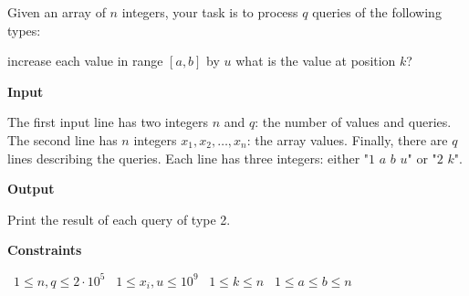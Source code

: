 Given an array of $n$ integers, your task is to process $q$ queries of the following types:

increase each value in range $[a,b]$ by $u$
what is the value at position $k$?

\vspace{0.3cm}\noindent\textbf{Input}

The first input line has two integers $n$ and $q$: the number of values and queries.
The second line has $n$ integers $x_1,x_2,\dots,x_n$: the array values.
Finally, there are $q$ lines describing the queries. Each line has three integers: either "$1$ $a$ $b$ $u$" or "$2$ $k$".

\vspace{0.3cm}\noindent\textbf{Output}

Print the result of each query of type 2.

\vspace{0.3cm}\noindent\textbf{Constraints}

\textbullet\ $1 \le n,q \le 2 \cdot 10^5$
\textbullet\ $1 \le x_i, u \le 10^9$
\textbullet\ $1 \le k \le n$
\textbullet\ $1 \le a \le b \le n$